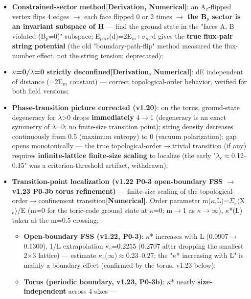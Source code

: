 \documentclass[12pt]{article}
\newcommand{\mtag}[1]{\textbf{[#1]}}
\newcommand{\down}[1]{\ensuremath{_{#1}}}
\begin{document}
\begin{itemize}
\item \textbf{Constrained-sector method\mtag{Derivation, Numerical}}: an A\down{v}-flipped vertex flips 4 edges \ensuremath{\to} each face flipped 0 or 2 times \ensuremath{\to} \textbf{the B\down{p} sector is an invariant subspace of H} --- find the ground state in the "faces A, B violated (B\down{p}=0)" subspace; E\down{pair}(d)=2E\down{m}+\ensuremath{\sigma}\down{m}\ensuremath{\cdot}d gives the \textbf{true flux-pair string potential} (the old "boundary-path-flip" method measured the flux-number effect, not the string tension; deprecated);
\item \textbf{\ensuremath{\kappa}=0/\ensuremath{\lambda}=0 strictly deconfined}\mtag{Derivation, Numerical}: dE independent of distance (=2E\down{m} constant) --- correct topological-order behavior, verified for both field versions;
\item \textbf{Phase-transition picture corrected (v1.20)}: on the torus, ground-state degeneracy for \ensuremath{\lambda}>0 drops \textbf{immediately} 4\ensuremath{\to}1 (degeneracy is an exact symmetry of \ensuremath{\lambda}=0; no finite-size transition point); string density decreases continuously from 0.5 (maximum entropy) to 0 (vacuum polarization); gap opens monotonically --- the true topological-order\ensuremath{\to}trivial transition (if any) requires \textbf{infinite-lattice finite-size scaling} to localize (the early "\ensuremath{\lambda}\down{c}\ensuremath{\approx}0.12--0.15" was a criterion-threshold artifact, withdrawn);
\item \textbf{Transition-point localization (v1.22 P0-3 open-boundary FSS \ensuremath{\to} v1.23 P0-3b torus refinement)} --- finite-size scaling of the topological-order\ensuremath{\to}confinement transition\mtag{Numerical}. Order parameter m(\ensuremath{\kappa},L)=\ensuremath{\Sigma}\down{e}\ensuremath{\langle}X\down{e}\ensuremath{\rangle}/E (m=0 for the toric-code ground state at \ensuremath{\kappa}=0; m\ensuremath{\to}1 as \ensuremath{\kappa}\ensuremath{\to}\ensuremath{\infty}), \ensuremath{\kappa}*(L) taken at the m=0.5 crossing:
\begin{itemize}
\item \textbf{Open-boundary FSS (v1.22, P0-3)}: \ensuremath{\kappa}* increases with L (0.0907\ensuremath{\to}0.1300), 1/L extrapolation \ensuremath{\kappa}\down{c}=0.2255 (0.2707 after dropping the smallest 2\ensuremath{\times}3 lattice) --- estimate \ensuremath{\kappa}\down{c}(\ensuremath{\infty})\ensuremath{\approx}0.23--0.27; the "\ensuremath{\kappa}* increasing with L" is mainly a boundary effect (confirmed by the torus, v1.23 below);
\item \textbf{Torus (periodic boundary, v1.23, P0-3b)}: \ensuremath{\kappa}* nearly \textbf{size-independent} across 4 sizes ---
\end{itemize}
\end{itemize}
\end{document}
